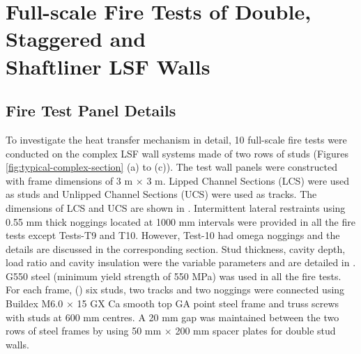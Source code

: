 \section[Full-scale Fire Tests of Double, Staggered and Shaftliner LSF Walls]{Full-scale Fire Tests of Double, Staggered and \\Shaftliner LSF Walls}
\subsection{Fire Test Panel Details}\label{sec:fire-test-panel-details}

To investigate the heat transfer mechanism in detail, 10 full-scale fire tests were conducted on the complex LSF wall systems made of two rows of studs (Figures \ref{fig:typical-complex-section} (a) to (c)). The test wall panels were constructed with frame dimensions of 3 m \(\times\) 3 m. Lipped Channel Sections (LCS) were used as studs and Unlipped Channel Sections (UCS) were used as tracks. The dimensions of LCS and UCS are shown in . Intermittent lateral restraints using 0.55 mm thick noggings located at 1000 mm intervals were provided in all the fire tests except Tests-T9 and T10. However, Test-10 had omega noggings and the details are discussed in the corresponding section. Stud thickness, cavity depth, load ratio and cavity insulation were the variable parameters and are detailed in . G550 steel (minimum yield strength of 550 MPa) was used in all the fire tests. For each frame, () six studs, two tracks and two noggings were connected using Buildex M6.0 \(\times\) 15 GX Ca smooth top GA point steel frame and truss screws with studs at 600 mm centres. A 20 mm gap was maintained between the two rows of steel frames by using 50 mm $\times$ 200 mm spacer plates for double stud walls. 
